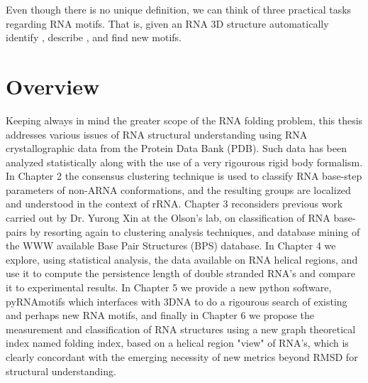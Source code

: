 Even  though there  is no  unique definition,  we can  think  of three
practical  tasks regarding  RNA  motifs.   That is,  given  an RNA  3D
structure  automatically   identify  \cite{nasalean2009,  lemieux2006,
  duarte2003},  describe  \cite{laing2009,  laing2009a,  holbrook2008,
  spackova2006,   reblova2003},   and   find   new   \cite{sarver2008,
  mokdad2008, duarte2003, stonge2007, lemieux2006} motifs.

\section{Overview}
Keeping always in  mind the greater scope of  the RNA folding problem,
this thesis  addresses various issues of  RNA structural understanding
using RNA crystallographic data from the Protein Data Bank (PDB). Such
data  has been analyzed  statistically along  with the  use of  a very
rigourous rigid body formalism.  In Chapter 2 the consensus clustering
technique  is used to  classify RNA  base-step parameters  of non-ARNA
conformations, and  the resulting groups are  localized and understood
in the context  of rRNA.  Chapter 3 reconsiders  previous work carried
out by  Dr. Yurong Xin  at the Olson's  lab, on classification  of RNA
base-pairs by  resorting again to clustering  analysis techniques, and
database  mining  of the  WWW  available  Base  Pair Structures  (BPS)
database.  In Chapter 4  we explore,  using statistical  analysis, the
data  available on  RNA helical  regions, and  use it  to  compute the
persistence  length  of  double  stranded  RNA's  and  compare  it  to
experimental results. In  Chapter 5 we provide a  new python software,
pyRNAmotifs which  interfaces with  3DNA to do  a rigourous  search of
existing  and perhaps  new RNA  motifs, and  finally in  Chapter  6 we
propose the  measurement and classification of RNA  structures using a
new graph  theoretical index named  folding index, based on  a helical
region "view" of RNA's, which  is clearly concordant with the emerging
necessity of new metrics beyond RMSD for structural understanding.


